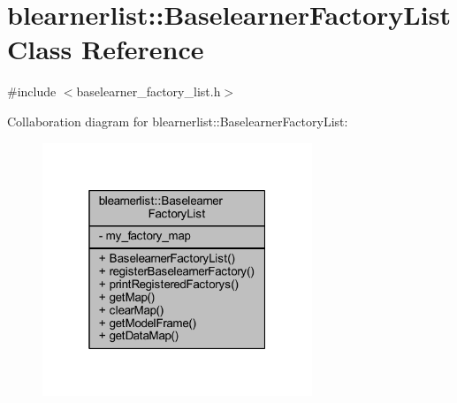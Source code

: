 \hypertarget{classblearnerlist_1_1_baselearner_factory_list}{}\section{blearnerlist\+:\+:Baselearner\+Factory\+List Class Reference}
\label{classblearnerlist_1_1_baselearner_factory_list}


{\ttfamily \#include $<$baselearner\+\_\+factory\+\_\+list.\+h$>$}



Collaboration diagram for blearnerlist\+:\+:Baselearner\+Factory\+List\+:
\nopagebreak
\begin{figure}[H]
\begin{center}
\leavevmode
\includegraphics[width=229pt]{classblearnerlist_1_1_baselearner_factory_list__coll__graph}
\end{center}
\end{figure}
